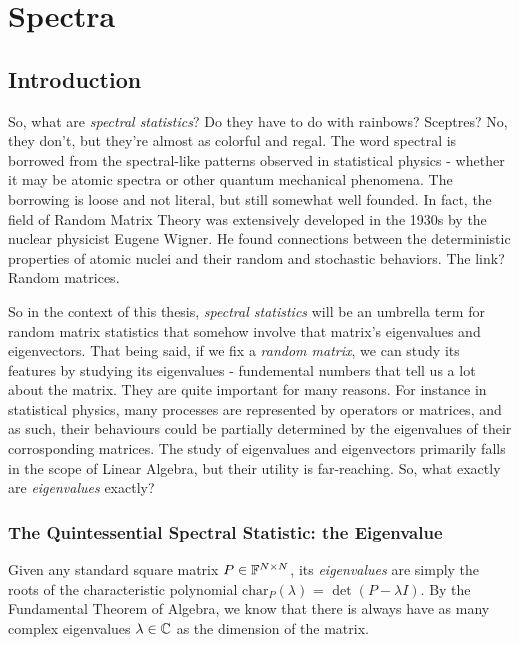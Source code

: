 
\chapter{Spectra}

\section{Introduction}
So, what are \textit{spectral statistics}? Do they have to do with rainbows? Sceptres? No, they don’t, but they’re almost as colorful and regal. The word spectral is borrowed from the spectral-like patterns observed in statistical physics - whether it may be atomic spectra or other quantum mechanical phenomena. The borrowing is loose and not literal, but still somewhat well founded. In fact, the field of Random Matrix Theory was extensively developed in the 1930s by the nuclear physicist Eugene Wigner. He found connections between the deterministic properties of atomic nuclei and their random and stochastic behaviors. The link? Random matrices.

So in the context of this thesis, \textit{spectral statistics} will be an umbrella term for random matrix statistics that somehow involve that matrix's eigenvalues and eigenvectors. That being said, if we fix a \textit{random matrix}, we can study its features by studying its eigenvalues - fundemental numbers that tell us a lot about the matrix. They are quite important for many reasons. For instance in statistical physics, many processes are represented by operators or matrices, and as such, their behaviours could be partially determined by the eigenvalues of their corrosponding matrices. The study of eigenvalues and eigenvectors primarily falls in the scope of Linear Algebra, but their utility is far-reaching. So, what exactly are \textit{eigenvalues} exactly?


\subsection{The Quintessential Spectral Statistic: the Eigenvalue}
Given any standard square matrix $P \in \mathbb{F}^{N \times N}$, its \textit{eigenvalues} are simply the roots of the characteristic polynomial $\text{char}_P{(\lambda)}$ = $\det(P - \lambda I)$. By the Fundamental Theorem of Algebra, we know that there is always have as many complex eigenvalues $\lambda \in \mathbb{C}$ as the dimension of the matrix. 

